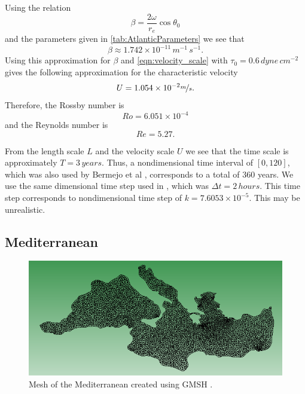 Using the relation
\begin{equation}
  \beta = \frac{2\omega}{r_e}\cos \theta_0
  \label{eqn:Beta}
\end{equation}
and the parameters given in \autoref{tab:AtlanticParameters} we see that
\begin{equation*}
  \beta \approx 1.742\times 10^{-11}\, m^{-1}\,s^{-1}.
\end{equation*}
Using this approximation for $\beta$ and \eqref{eqn:velocity_scale} with
{\color{red}$\tau_0 = 0.6\, dyne\, cm^{-2}$ \cite{Hellerman} gives the following
approximation for the characteristic velocity
\begin{equation*}
    U = 1.054\times 10^{-2} \nicefrac{m}{s}.
\end{equation*}
Therefore, the Rossby number is
\begin{equation*}
  Ro = 6.051\times 10^{-4}
\end{equation*}
and the Reynolds number is
\begin{equation*}
  Re = 5.27.
\end{equation*}}

From the length scale $L$ and the velocity scale $U$ we see that the time scale
is approximately $T = 3\, years$. Thus, a nondimensional time interval of
$[0,120]$, which was also used by Bermejo et al \cite{delSastre04}, corresponds
to a total of $360$ years. We use the same dimensional time step used in
\cite{delSastre04}, which was $\Delta t = 2\, hours$. This time step corresponds
to nondimensional time step of $k = 7.6053 \times 10^{-5}$. {\color{red} This
may be unrealistic.}

\subsection{Mediterranean}

\begin{figure}
  \begin{center}
    \includegraphics[scale=0.5]{MedMesh.png}
    \caption{Mesh of the Mediterranean created using GMSH \cite{GMSH}.}
    \label{fig:MedMesh}
  \end{center}
\end{figure}

